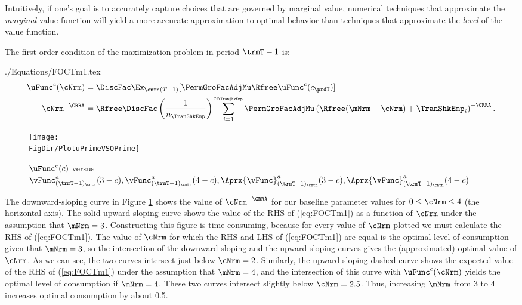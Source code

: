 \documentclass[\econtexRoot/SolvingMicroDSOPs]{subfiles}
\begin{document}
Intuitively, if one's goal is to accurately capture choices
that are governed by marginal value,
numerical techniques that approximate the \textit{marginal} value
function will yield a more accurate approximation to
optimal behavior than techniques that approximate the \textit{level}
of the value function.

The first order condition of the maximization problem in period $\trmT-1$ is:
\begin{verbatimwrite}{./Equations/FOCTm1.tex}
  \begin{equation}\begin{gathered}\begin{aligned}
        \uFunc^{c}(\cNrm)       & = \DiscFac \Ex_{\cntn(T-1)} [\PermGroFacAdjMu\Rfree \uFunc^{c}(c_{\prdT})]  %
        \\      \cNrm^{-\CRRA}   & = \Rfree \DiscFac \left(\frac{1}{n_{\TranShkEmp}}\right) \sum_{i=1}^{n_{\TranShkEmp}} \PermGroFacAdjMu\left(\Rfree (\mNrm-\cNrm) + \TranShkEmp_{i}\right)^{-\CRRA} \label{eq:FOCTm1}.
      \end{aligned}\end{gathered}\end{equation}
\end{verbatimwrite}
\unskip
\hypertarget{PlotuPrimeVSOPrime}{}
\begin{figure}
  \centerline{\texttt{[image: \\FigDir/PlotuPrimeVSOPrime]}}
  \caption{$\uFunc^{c}(c)$ versus $\vFunc_{({\trmT-1})_\cntn}^{a}(3-c), \vFunc_{({\trmT-1})_\cntn}^{a}(4-c), \Aprx{\vFunc}_{({\trmT-1})_\cntn}^{a}(3-c), \Aprx{\vFunc}_{({\trmT-1})_\cntn}^{a}(4-c)$}
  \label{fig:PlotuPrimeVSOPrime}
\end{figure}



The downward-sloping curve in Figure \ref{fig:PlotuPrimeVSOPrime}
shows the value of $\cNrm^{-\CRRA}$ for our baseline parameter values
for $0 \leq \cNrm \leq 4$ (the horizontal axis).  The solid
upward-sloping curve shows the value of the RHS of (\ref{eq:FOCTm1})
as a function of $\cNrm$ under the assumption that $\mNrm=3$.
Constructing this figure is time-consuming, because for every
value of $\cNrm$ plotted we must calculate the RHS of
(\ref{eq:FOCTm1}).  The value of $\cNrm$ for which the RHS and LHS
of (\ref{eq:FOCTm1}) are equal is the optimal level of consumption
given that $\mNrm=3$, so the intersection of the downward-sloping
and the upward-sloping curves gives the (approximated) optimal value of $\cNrm$.
As we can see, the two curves intersect just below $\cNrm=2$.
Similarly, the upward-sloping dashed curve shows the expected value
of the RHS of (\ref{eq:FOCTm1}) under the assumption that $\mNrm=4$,
and the intersection of this curve with $\uFunc^{c}(\cNrm)$ yields the
optimal level of consumption if $\mNrm=4$.  These two curves
intersect slightly below $\cNrm=2.5$.  Thus, increasing $\mNrm$
from 3 to 4 increases optimal consumption by about 0.5.
\end{document}
